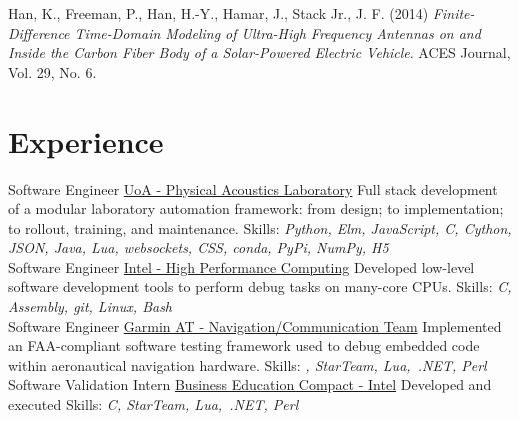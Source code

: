 \documentclass[a4paper]{twentysecondcv}
\begin{document}
Han, K., Freeman, P., Han, H.-Y., Hamar, J., Stack Jr., J. F. (2014)
\emph{Finite-Difference Time-Domain Modeling of Ultra-High Frequency Antennas
on and Inside the Carbon Fiber Body of a Solar-Powered Electric Vehicle}. ACES
Journal, Vol. 29, No. 6.

\section{Experience}
\begin{twenty}
           {}
           {Software Engineer}
           {\href{https://pal.auckland.ac.nz/}{UoA - Physical Acoustics Laboratory}}
           {}
           {Full stack development of a modular laboratory automation
           framework: from design; to implementation; to rollout, training, and
           maintenance. Skills: \emph{Python, Elm, JavaScript, C, Cython, JSON,
           Java, Lua, websockets, CSS, conda, PyPi, NumPy, H5}} \\

           {}
           {Software Engineer}
           {\href{https://www.intel.com}{Intel - High Performance Computing}}
           {}
           {Developed low-level software development tools to perform debug
           tasks on many-core CPUs. Skills: \emph{C, Assembly, git, Linux,
           Bash}} \\

           {}
           {Software Engineer}
           {\href{http://www.garmin.com}{Garmin AT - Navigation/Communication Team}}
           {}
           {Implemented an FAA-compliant software testing framework used to
           debug embedded code within aeronautical navigation hardware. Skills:
           \emph{\CC, StarTeam, Lua,~.NET, Perl}} \\

           {}
           {Software Validation Intern}
           {\href{https://www.becpdx.org/}{Business Education Compact - Intel}}
           {}
           {Developed and executed Skills:
           \emph{C, StarTeam, Lua,~.NET, Perl}}
\end{twenty}
\end{document}
